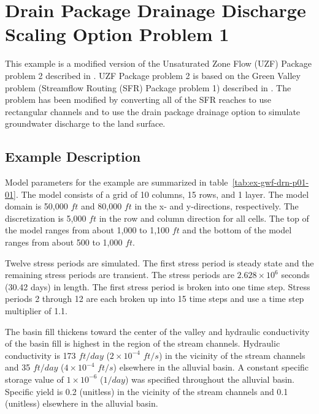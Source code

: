 \section{Drain Package Drainage Discharge Scaling Option Problem 1}

This example is a modified version of the Unsaturated Zone Flow (UZF) Package problem 2 described in \cite{UZF}. UZF Package problem 2 is based on the Green Valley problem (Streamflow Routing (SFR) Package problem 1) described in \cite{modflowsfr1pack}. The problem has been modified by converting all of the SFR reaches to use rectangular channels and to use the drain package drainage option to simulate groundwater discharge to the land surface.                               

\subsection{Example Description}
Model parameters for the example are summarized in table~\ref{tab:ex-gwf-drn-p01-01}.  The model consists of a grid of 10 columns, 15 rows, and 1 layer. The model domain is  50,000 $ft$ and 80,000 $ft$ in the x- and y-directions, respectively. The discretization is 5,000 $ft$ in the row and column direction for all cells. The top of the model ranges from about 1,000 to 1,100 $ft$ and the bottom of the model ranges from about 500 to 1,000 $ft$.

Twelve stress periods are simulated. The first stress period is steady state and the remaining stress periods are transient. The stress periods are $2.628 \times 10^{6}$ seconds (30.42 days) in length. The first stress period is broken into one time step. Stress periods 2 through 12 are each broken up into 15 time steps and use a time step multiplier of 1.1.



The basin fill thickens toward the center of the valley and hydraulic conductivity of the basin fill is highest in the region of the stream channels. Hydraulic conductivity is 173 $ft/day$ ($2 \times 10^{-4}$ $ft/s$) in the vicinity of the stream channels and 35 $ft/day$ ($4 \times 10^{-4}$ $ft/s$) elsewhere in the alluvial basin. A constant specific storage value of $1 \times 10^{-6}$ ($1/day$) was specified throughout the alluvial basin. Specific yield is 0.2 (unitless) in the vicinity of the stream channels and 0.1 (unitless) elsewhere in the alluvial basin.

